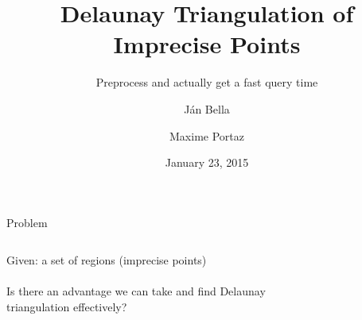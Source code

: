 \documentclass{beamer}
\author{J\'an Bella \and Maxime Portaz}
\title{Delaunay Triangulation of Imprecise Points}
\subtitle{Preprocess and actually get a fast query time}
\institute{Grenoble INP}
\date{January 23, 2015}
\begin{document}
\frame{\titlepage}
\begin{frame}{Problem}
\begin{columns}
Given: 
a set of regions (imprecise points)\\
\pause
~\\
Is there an advantage we can take and find Delaunay triangulation effectively?
\begin{figure}
		\centering
\hspace*{-0.5cm}		
	\end{figure}


\end{columns}
\end{frame}
\end{document}
